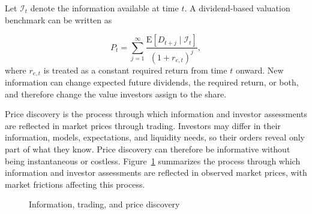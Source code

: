 Let \(\mathcal{I}_t\) denote the information available at time \(t\). A dividend-based valuation benchmark can be written as

\begin{equation}
P_t
=
\sum_{j=1}^{\infty}
\frac{\mathrm{E}[D_{t+j}\mid\mathcal{I}_t]}
{(1+r_{e,t})^j},
\label{eq:ch9-information-price}
\end{equation}
where \(r_{e,t}\) is treated as a constant required return from time \(t\) onward. New information can change expected future dividends, the required return, or both, and therefore change the value investors assign to the share.

Price discovery is the process through which information and investor assessments are reflected in market prices through trading. Investors may differ in their information, models, expectations, and liquidity needs, so their orders reveal only part of what they know. Price discovery can therefore be informative without being instantaneous or costless. Figure~\ref{fig:ch9-price-discovery} summarizes
the process through which information and investor
assessments are reflected in observed market prices,
with market frictions affecting this process.


\begin{figure}[H]

\centering


\caption{Information, trading, and price discovery}
\label{fig:ch9-price-discovery}
\end{figure}

